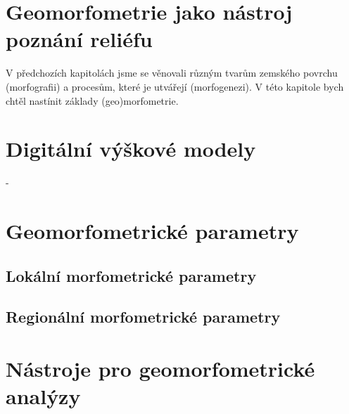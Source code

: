 \section{Geomorfometrie jako nástroj poznání reliéfu}
V předchozích kapitolách jsme se věnovali různým tvarům zemského povrchu (morfografii) a procesům, které je utvářejí (morfogenezi). V této kapitole bych chtěl nastínit základy (geo)morfometrie. 

\section{Digitální výškové modely}

-




\section{Geomorfometrické parametry}





\subsection{Lokální morfometrické parametry}




\subsection{Regionální morfometrické parametry}




\section{Nástroje pro geomorfometrické analýzy}